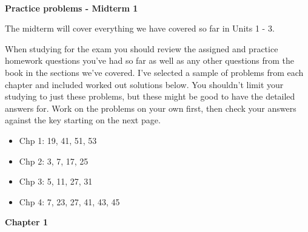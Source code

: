 \documentclass[11pt]{article}
\begin{document}
$\:$ \\
\vspace{2cm}

{\LARGE \textcolor{custom_blue}{\textbf{Practice problems - Midterm 1}}}

The midterm will cover everything we have covered so far in Units 1 - 3.

When studying for the exam you should review the assigned and practice homework questions you've had so far as well as any other questions from the book in the sections we've covered. I've selected a sample of problems from each chapter and included worked out solutions below. You shouldn't limit your studying to just these problems, but these might be good to have the detailed answers for. Work on the problems on your own first, then check your answers against the key starting on the next page.

\begin{itemize}
\renewcommand\labelitemi{\textcolor{custom_blue}{{\footnotesize $\blacksquare$}}}
\item Chp 1: 19, 41, 51, 53
\item Chp 2: 3, 7, 17, 25
\item Chp 3: 5, 11, 27, 31
\item Chp 4: 7, 23, 27, 41, 43, 45%
\end{itemize}



\pagebreak

{\Large \textcolor{custom_blue}{\textbf{Chapter 1}}}
\end{document}

